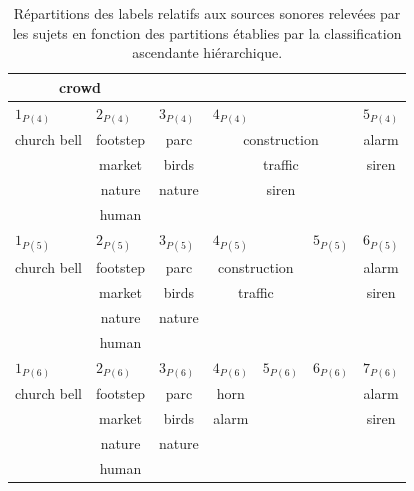 \begin{table}[t]
\begin{tabular}{c|c|c|c|c|c|c}
\multicolumn{2}{c|}{crowd}       &          & \multicolumn{3}{c|}{}             &  \\      
\hline
\multicolumn{1}{l|}{$1_{P(4)}$} & \multicolumn{1}{l|}{$2_{P(4)}$} & \multicolumn{1}{l|}{$3_{P(4)}$}  & \multicolumn{3}{l|}{$4_{P(4)}$} & \multicolumn{1}{l}{$5_{P(4)}$} \\
church bell         & footstep   & parc   & \multicolumn{3}{c|}{construction} & alarm\\
                    & market     & birds  & \multicolumn{3}{c|}{traffic}      & siren\\
                    & nature     & nature & \multicolumn{3}{c|}{siren}        & \\
                    & human      &        & \multicolumn{3}{c|}{}             & \\
\hline
\multicolumn{1}{l|}{$1_{P(5)}$} & \multicolumn{1}{l|}{$2_{P(5)}$} & \multicolumn{1}{l|}{$3_{P(5)}$}  & \multicolumn{2}{l|}{$4_{P(5)}$} & \multicolumn{1}{l|}{$5_{P(5)}$} & \multicolumn{1}{l}{$6_{P(5)}$}\\ 
church bell          & footstep & parc   & \multicolumn{2}{c|}{construction} &     & alarm\\     
                     & market   & birds  & \multicolumn{2}{c|}{traffic}      &     & siren\\  
                     & nature   & nature & \multicolumn{2}{c|}{}             &     &  \\  
                     & human    &        & \multicolumn{2}{c|}{}             &     &  \\                  
\hline
\multicolumn{1}{l|}{$1_{P(6)}$} & \multicolumn{1}{l|}{$2_{P(6)}$} & \multicolumn{1}{l|}{$3_{P(6)}$}  & \multicolumn{1}{l|}{$4_{P(6)}$} & \multicolumn{1}{l|}{$5_{P(6)}$} & \multicolumn{1}{l|}{$6_{P(6)}$} & \multicolumn{1}{l}{$7_{P(6)}$} \\  
church bell          & footstep    & parc   & horn       &      &     & alarm \\        
                     & market      & birds  & alarm      &      &     & siren \\  
                     & nature      & nature &            &      &     & \\  
                     & human       &        &            &      &     & \\  
\hline
\end{tabular}
\vspace{0.5mm}
\caption{Répartitions des labels relatifs aux sources sonores relevées par les sujets en fonction des partitions établies par la classification ascendante hiérarchique.}
\label{tab:markerHacSource}
\end{table}



